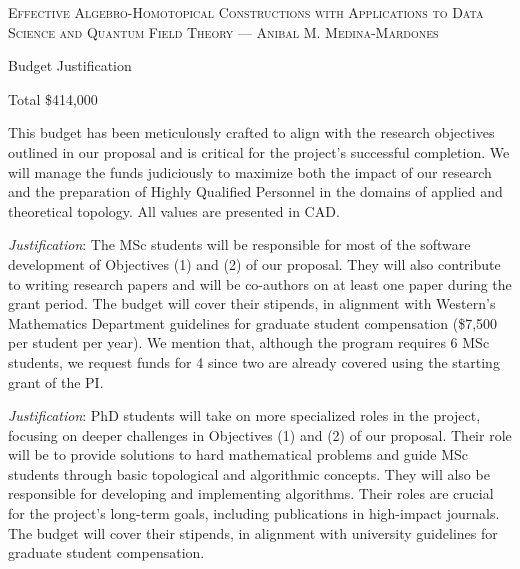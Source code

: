 \documentclass[12pt]{article}
\begin{document}
	\textsc{\large Effective Algebro-Homotopical Constructions with Applications to Data Science and Quantum Field Theory}
	--- \hfill \textsc{\large Anibal M. Medina-Mardones}

	\begin{center}
		\Huge Budget Justification
	\end{center}

	{\centering\Large Total \hfill \$414,000}\bigskip
	\par This budget has been meticulously crafted to align with the research objectives outlined in our proposal and is critical for the project's successful completion. We will manage the funds judiciously to maximize both the impact of our research and the preparation of Highly Qualified Personnel in the domains of applied and theoretical topology.
	All values are presented in CAD.

	\bigskip

	\bigskip

	\noindent\textit{Justification}:
	The MSc students will be responsible for most of the software development of Objectives (1) and (2) of our proposal. They will also contribute to writing research papers and will be co-authors on at least one paper during the grant period. The budget will cover their stipends, in alignment with Western's Mathematics Department guidelines for graduate student compensation (\$7,500 per student per year).
	We mention that, although the program requires 6 MSc students, we request funds for 4 since two are already covered using the starting grant of the PI.

	\bigskip

	\noindent\textit{Justification}:
	PhD students will take on more specialized roles in the project, focusing on deeper challenges in Objectives (1) and (2) of our proposal. Their role will be to provide solutions to hard mathematical problems and guide MSc students through basic topological and algorithmic concepts. They will also be responsible for developing and implementing algorithms. Their roles are crucial for the project's long-term goals, including publications in high-impact journals. The budget will cover their stipends, in alignment with university guidelines for graduate student compensation.

	\bigskip
\end{document}
